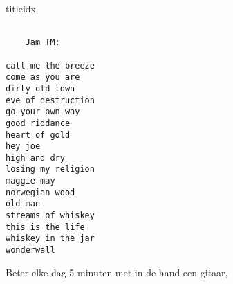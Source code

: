 \documentclass[a4,openany,portrait,tikz]{article}
\begin{document}
\begin{songs}{titleidx}
\renewcommand{\thesongnum}{U}
  
  

\renewcommand{\thesongnum}{W}
	
	
	
	
	
	
	
	

\newpage

\renewcommand{\thesongnum}{Y}
	
	
\newpage

\renewcommand{\thesongnum}{Z}
	
	
	
\newpage

\newpage
\chordsoff
\chordson



\newpage
\begin{Large}
\begin{verbatim}

    Jam TM:

call me the breeze
come as you are
dirty old town
eve of destruction
go your own way
good riddance
heart of gold
hey joe
high and dry
losing my religion
maggie may
norwegian wood
old man
streams of whiskey
this is the life
whiskey in the jar
wonderwall
\end{verbatim}
\end{Large}



\newpage

\renewcommand{\thesongnum}{Jam}
  
  
  
  
  
  
  
  
  
  
  
  
  
  
  
  
%  

  
%  
%  





			Beter elke dag 5 minuten met in de hand een gitaar,


\end{songs}
\end{document}
